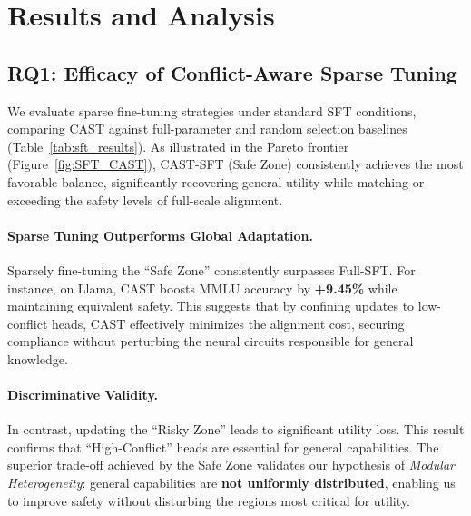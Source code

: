 \documentclass[11pt]{article}
\begin{document}


\section{Results and Analysis}
\label{sec:results}

\subsection{RQ1: Efficacy of Conflict-Aware Sparse Tuning}
\label{sec:rq1_sft}

We evaluate sparse fine-tuning strategies under standard SFT conditions, comparing CAST against full-parameter and random selection baselines (Table~\ref{tab:sft_results}). As illustrated in the Pareto frontier (Figure~\ref{fig:SFT_CAST}), CAST-SFT (Safe Zone) consistently achieves the most favorable balance, significantly recovering general utility while matching or exceeding the safety levels of full-scale alignment.

\paragraph{Sparse Tuning Outperforms Global Adaptation.}
Sparsely fine-tuning the ``Safe Zone'' consistently surpasses Full-SFT. For instance, on Llama, CAST boosts MMLU accuracy by \textbf{+9.45\%} while maintaining equivalent safety. 
This suggests that by confining updates to low-conflict heads, CAST effectively minimizes the alignment cost, securing compliance without perturbing the neural circuits responsible for general knowledge.

\paragraph{Discriminative Validity.}
In contrast, updating the ``Risky Zone'' leads to significant utility loss. This result confirms that ``High-Conflict'' heads are essential for general capabilities. The superior trade-off achieved by the Safe Zone validates our hypothesis of \textit{Modular Heterogeneity}: general capabilities are \textbf{not uniformly distributed}, enabling us to improve safety without disturbing the regions most critical for utility.
\end{document}
